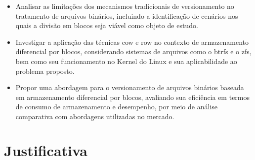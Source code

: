 \begin{itemize}
    \item Analisar as limitações dos mecanismos tradicionais de versionamento no tratamento de arquivos binários, incluindo a identificação de cenários nos quais a divisão em blocos seja viável como objeto de estudo.
    
    \item Investigar a aplicação das técnicas \gls{cow} e \gls{row} no contexto de armazenamento diferencial por blocos, considerando sistemas de arquivos como o \gls{btrfs}  e o \gls{zfs}, bem como seu funcionamento no Kernel do Linux e sua aplicabilidade ao problema proposto.
    
    \item Propor uma abordagem para o versionamento de arquivos binários baseada em armazenamento diferencial por blocos, avaliando sua eficiência em termos de consumo de armazenamento e desempenho, por meio de análise comparativa com abordagens utilizadas no mercado.
    
\end{itemize}




\section{Justificativa}\label{sec:justificativa}

